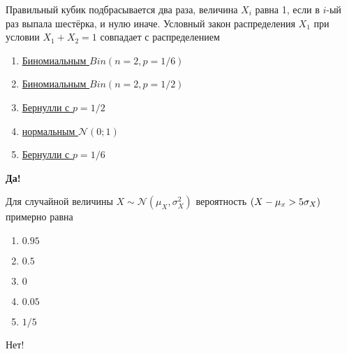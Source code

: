 \documentclass[t]{beamer}
\let\P\relax
\DeclareMathOperator{\P}{\mathbb{P}}
\newcommand{\cN}{\mathcal{N}}
\begin{document}
 \begin{frame} \label{40-Yes} 
\begin{block}{40} 

Правильный кубик подбрасывается два раза, величина $X_i$ равна 1, если в $i$-ый раз выпала шестёрка, и нулю иначе. Условный закон распределения $X_1$ при условии $X_1+X_2=1$ совпадает с распределением


 \end{block} 
\begin{enumerate} 
\item[] \hyperlink{40-No}{\beamergotobutton{}  Биномиальным $Bin(n=2, p=1/6)$ }
\item[] \hyperlink{40-No}{\beamergotobutton{}  Биномиальным $Bin(n=2, p=1/2)$ }
\item[] \hyperlink{40-Yes}{\beamergotobutton{}  Бернулли с $p=1/2$ }
\item[] \hyperlink{40-No}{\beamergotobutton{}  нормальным $\cN(0;1)$ }
\item[] \hyperlink{40-No}{\beamergotobutton{}  Бернулли с $p=1/6$ }
\end{enumerate} 

 \textbf{Да!} 
 \hyperlink{41}{}\end{frame} 


 \begin{frame} \label{1-No} 
\begin{block}{1} 

  Для случайной величины $X \sim \cN(\mu_X, \sigma^2_X)$ вероятность $\P(X - \mu_x > 5\sigma_X)$  примерно равна
  


 \end{block} 
\begin{enumerate} 
\item[] \hyperlink{1-No}{\beamergotobutton{} $0.95$}
\item[] \hyperlink{1-No}{\beamergotobutton{} $0.5$}
\item[] \hyperlink{1-Yes}{\beamergotobutton{} $0$}
\item[] \hyperlink{1-No}{\beamergotobutton{} $0.05$}
\item[] \hyperlink{1-No}{\beamergotobutton{} $1/5$}
\end{enumerate} 

 \alert{Нет!} 
\end{frame} 
\end{document}
